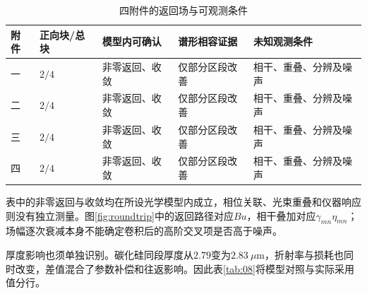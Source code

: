 \begingroup
\footnotesize
\begin{longtable}{>{\centering\arraybackslash}p{}>{\centering\arraybackslash}p{}>{\centering\arraybackslash}p{}>{\centering\arraybackslash}p{}>{\centering\arraybackslash}p{}}
\caption{四附件的返回场与可观测条件}\label{tab:q3-attachment-conditions}\\
\hline
附件 & 正向块/总块 & 模型内可确认 & 谱形相容证据 & 未知观测条件\\
\hline
一 & $2/4$ & 非零返回、收敛 & 仅部分区段改善 & 相干、重叠、分辨及噪声\\
二 & $2/4$ & 非零返回、收敛 & 仅部分区段改善 & 相干、重叠、分辨及噪声\\
三 & $2/4$ & 非零返回、收敛 & 仅部分区段改善 & 相干、重叠、分辨及噪声\\
四 & $2/4$ & 非零返回、收敛 & 仅部分区段改善 & 相干、重叠、分辨及噪声\\
\hline
\end{longtable}
\endgroup

表中的非零返回与收敛均在所设光学模型内成立，相位关联、光束重叠和仪器响应则没有独立测量。图\ref{fig:roundtrip}中的返回路径对应$Bu$，相干叠加对应$\gamma_{mn}\eta_{mn}$；场幅逐次衰减本身不能确定卷积后的高阶交叉项是否高于噪声。

厚度影响也须单独识别。碳化硅同段厚度从$2.79$变为$2.83\ \mu\mathrm{m}$，折射率与损耗也同时改变，差值混合了参数补偿和往返影响。因此表\ref{tab:08}将模型对照与实际采用值分行。

